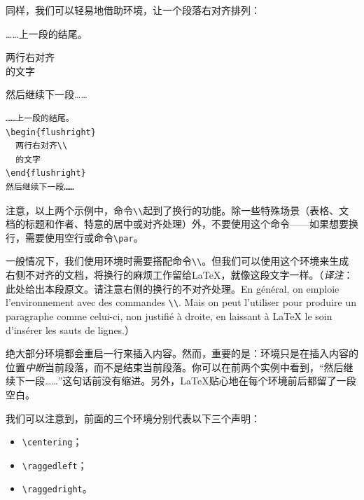 同样，我们可以轻易地借助环境，让一个段落右对齐排列：

\begin{codelist}[2.6]{
    ……上一段的结尾。
    \begin{flushright}
      两行右对齐\\
      的文字
    \end{flushright}
    然后继续下一段……
    }
\begin{verbatim}
……上一段的结尾。
\begin{flushright}
  两行右对齐\\
  的文字
\end{flushright}
然后继续下一段……\end{verbatim}
\end{codelist}

注意，以上两个示例中，命令\verb|\\|起到了换行的功能。除一些特殊场景（表格、文档的标题和作者、特意的居中或对齐处理）外，不要使用这个命令——如果想要换行，需要使用空行或命令\verb|\par|。

\begin{flushleft}
    一般情况下，我们使用环境时需要搭配命令\verb|\\|。但我们可以使用这个环境来生成右侧不对齐的文档，将换行的麻烦工作留给\LaTeX ，就像这段文字一样。（\textsl{译注}：此处给出本段原文。请注意右侧的换行的不对齐处理。En général, on emploie l'environnement  avec des commandes \verb|\\|. Mais on peut l'utiliser pour produire un paragraphe comme celui-ci, non justifié à droite, en laissant à \LaTeX{} le soin d’insérer les sauts de lignes.）
\end{flushleft}

\begin{exclamation}
    绝大部分环境都会重启一行来插入内容。然而，重要的是：环境只是在插入内容的位置\emph{中断}当前段落，而不是结束当前段落。你可以在前两个实例中看到，“然后继续下一段……”这句话前没有缩进。另外，\LaTeX 贴心地在每个环境前后都留了一段空白。
\end{exclamation}

我们可以注意到，前面的三个环境分别代表以下三个声明：

\begin{itemize}
    \item \verb|\centering|；
    \item \verb|\raggedleft|；
    \item \verb|\raggedright|。
\end{itemize}

